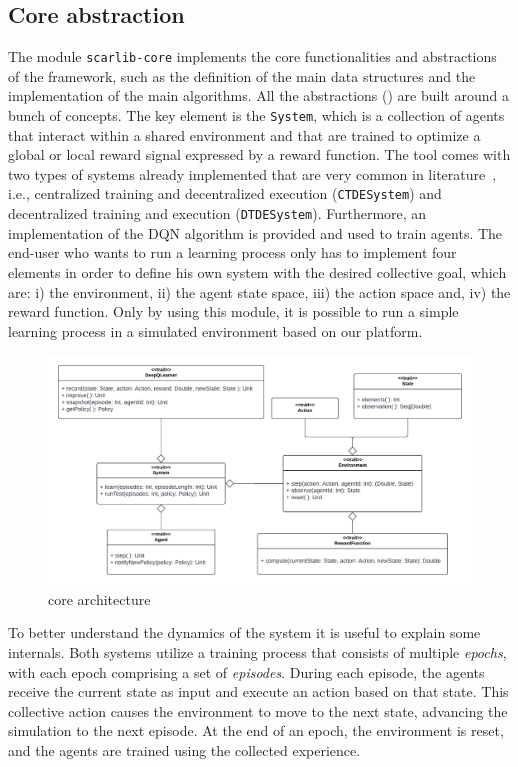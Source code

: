 \subsection{Core abstraction} The module \texttt{scarlib-core} implements the core functionalities and abstractions of the framework, such as the definition of the main data structures and the implementation of the main algorithms. 
%
All the abstractions () are built around a bunch of concepts. The key element is the \texttt{System}, which is a collection of agents that interact within a shared environment and that are trained to optimize a global or local reward signal
expressed by a reward function. 
%
The tool comes with two types of systems already implemented that are very common in literature~\cite{Du2020},
i.e., centralized training and decentralized execution (\texttt{CTDESystem}) and decentralized training and execution (\texttt{DTDESystem}).
Furthermore, an implementation of the DQN algorithm \cite{Mnih2015} is provided and used to train agents. 
The end-user who wants to run a learning process only has to implement four elements
in order to define his own system with the desired collective goal, which are: 
 i) the environment, 
 ii) the agent state space, 
 iii) the action space and,
 iv) the reward function.
Only by using this module, 
 it is possible to run a simple learning process in a simulated environment based on our platform.

\begin{figure}[t]
    \centering
    \includegraphics[width=\textwidth]{papers/coordination2023/imgs/core-architecture.pdf}
    \caption{\scarlib{} core architecture}
    \label{coordination2023:fig:arc}
\end{figure} %

To better understand the dynamics of the system it is useful to explain some internals.
%
Both systems utilize a training process that consists of multiple \emph{epochs}, 
 with each epoch comprising a set of \emph{episodes}. 
 During each episode, 
 the agents receive the current state as input and 
 execute an action based on that state. 
This collective action causes 
 the environment to move to the next state, 
 advancing the simulation to the next episode.
At the end of an epoch, 
 the environment is reset, and the agents are trained using the collected experience.


